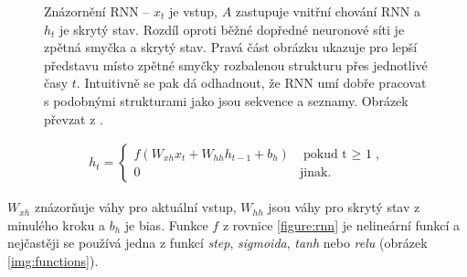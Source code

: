 \begin{figure}[H]
    \begin{center}
    \end{center}
	\caption{Znázornění RNN -- $x_t$ je vstup, $A$ zastupuje vnitřní chování RNN a $h_t$ je skrytý stav. Rozdíl oproti běžné dopředné neuronové síti je zpětná smyčka a skrytý stav. Pravá část obrázku ukazuje pro lepší představu místo zpětné smyčky rozbalenou strukturu přes jednotlivé časy $t$. Intuitivně se pak dá odhadnout, že RNN umí dobře pracovat s podobnými strukturami jako jsou sekvence a seznamy. Obrázek převzat z \cite{understandingLSTM}.}	
	\label{img:rnn}
\end{figure}

\begin{align}\label{figure:rnn}
  h_t = \begin{cases}
          f(W_{xh}x_t + W_{hh}h_{t-1} + b_h) & \mbox{pokud t $\geq$ 1}, \\
          0 & \mbox{jinak}.
        \end{cases}
\end{align}


$W_{xh}$ znázorňuje váhy pro aktuální vstup, $W_{hh}$ jsou váhy pro skrytý stav z minulého kroku a $b_h$ je bias. Funkce $f$ z rovnice \ref{figure:rnn} je nelineární funkcí a nejčastěji se používá jedna z funkcí \emph{step}, \emph{sigmoida}, \emph{tanh} nebo \emph{relu} (obrázek \ref{img:functions}).

